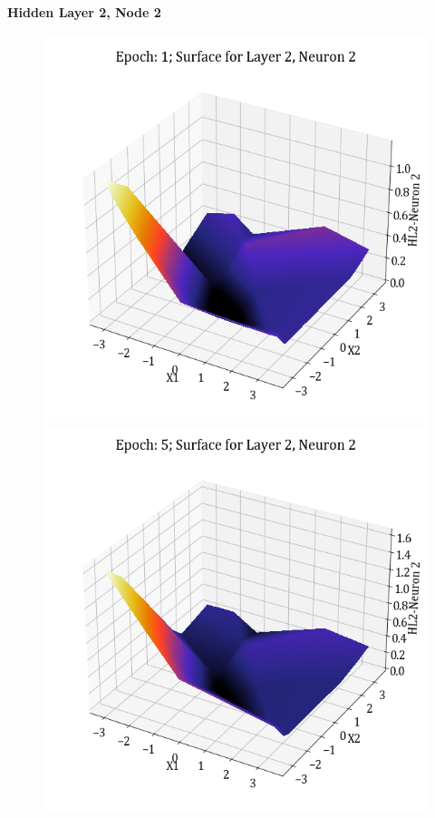 \documentclass[11pt,a4paper]{article}
\begin{document}
\paragraph{Hidden Layer 2, Node 2}
\begin{figure}[H]
    \centering
    \includegraphics[scale=0.4]{images/1B_MLFFNN_E1_HL2_N2.png}
    \includegraphics[scale=0.4]{images/1B_MLFFNN_E5_HL2_N2.png}

\end{figure}
\end{document}
